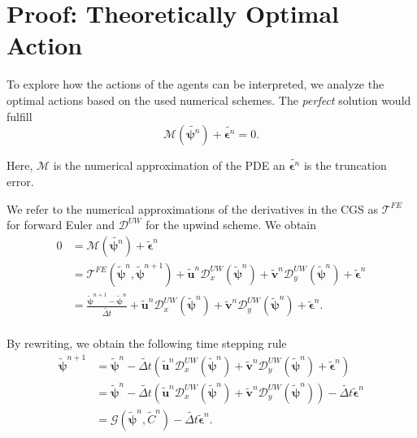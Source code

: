 \newpage
\section{Proof: Theoretically Optimal Action} \label{sec:proof_optimal_action}
To explore how the actions of the agents can be interpreted, we analyze the optimal actions based on the used numerical schemes. The \textit{perfect} solution would fulfill 
$$
 \mathcal{M}( \tilde{\boldsymbol \psi^n}) +\tilde{ \boldsymbol \epsilon^n}  = 0.
$$

Here, $\mathcal{M}$ is the numerical approximation of the PDE an  $\tilde{\boldsymbol \epsilon^n}$ is the truncation error.

We refer to the numerical approximations of the derivatives in the CGS as $\mathcal{T}^{FE}$ for forward Euler and $\mathcal{D}^{UW}$ for the upwind scheme. We obtain
\begin{align}
    0 &=  \mathcal{M}(\tilde{\boldsymbol\psi^n})+ \tilde{\boldsymbol\epsilon}^n\\
     &=\mathcal{T}^{FE}(\tilde{\boldsymbol\psi}^n, \tilde{\boldsymbol\psi}^{n+1}) + \tilde{\boldsymbol u}^n \mathcal{D}^{UW}_x(\tilde{\boldsymbol\psi}^n) + \tilde{\boldsymbol v}^n \mathcal{D}^{UW}_y(\tilde{\boldsymbol\psi}^n) + \tilde{\boldsymbol\epsilon}^n \\
     &=\frac{\tilde{\boldsymbol\psi}^{n+1} - \tilde{\boldsymbol\psi}^n}{\widetilde{\Delta t}} + \tilde{\boldsymbol u}^n \mathcal{D}^{UW}_x(\tilde{\boldsymbol\psi}^n) + \tilde{\boldsymbol v}^n \mathcal{D}^{UW}_y(\tilde{\boldsymbol\psi}^n) + \tilde{\boldsymbol\epsilon}^n. \\
\end{align}


By rewriting, we obtain the following time stepping rule
\begin{align}
   \tilde{\boldsymbol\psi}^{n+1} 
   &= \tilde{\boldsymbol\psi}^n - \widetilde{\Delta t} \left(\tilde{\boldsymbol u}^n \mathcal{D}^{UW}_x(\tilde{\boldsymbol\psi}^n) + \tilde{\boldsymbol v}^n \mathcal{D}^{UW}_y(\tilde{\boldsymbol\psi}^n) + \tilde{\boldsymbol\epsilon}^n\right)\\
   &= \tilde{\boldsymbol\psi}^n - \widetilde{\Delta t} \left(\tilde{\boldsymbol u}^n \mathcal{D}^{UW}_x(\tilde{\boldsymbol\psi}^n) + \tilde{\boldsymbol v}^n \mathcal{D}^{UW}_y(\tilde{\boldsymbol\psi}^n)\right) - \widetilde{\Delta t} \tilde{\boldsymbol \epsilon}^n\\
   &= \mathcal G(\tilde{\boldsymbol\psi}^n, \tilde C^n) - \widetilde{\Delta t} \tilde{\boldsymbol\epsilon}^n.
\end{align}

